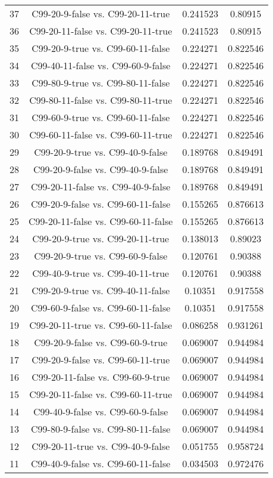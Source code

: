 \documentclass[a4paper,10pt]{article}
\begin{document}
\begin{landscape}
\begin{table}[!htp]
\begin{tabular}{cccc}
37&C99-20-9-false vs. C99-20-11-true&0.241523&0.80915\\
36&C99-20-11-false vs. C99-20-11-true&0.241523&0.80915\\
35&C99-20-9-true vs. C99-60-11-false&0.224271&0.822546\\
34&C99-40-11-false vs. C99-60-9-false&0.224271&0.822546\\
33&C99-80-9-true vs. C99-80-11-false&0.224271&0.822546\\
32&C99-80-11-false vs. C99-80-11-true&0.224271&0.822546\\
31&C99-60-9-true vs. C99-60-11-false&0.224271&0.822546\\
30&C99-60-11-false vs. C99-60-11-true&0.224271&0.822546\\
29&C99-20-9-true vs. C99-40-9-false&0.189768&0.849491\\
28&C99-20-9-false vs. C99-40-9-false&0.189768&0.849491\\
27&C99-20-11-false vs. C99-40-9-false&0.189768&0.849491\\
26&C99-20-9-false vs. C99-60-11-false&0.155265&0.876613\\
25&C99-20-11-false vs. C99-60-11-false&0.155265&0.876613\\
24&C99-20-9-true vs. C99-20-11-true&0.138013&0.89023\\
23&C99-20-9-true vs. C99-60-9-false&0.120761&0.90388\\
22&C99-40-9-true vs. C99-40-11-true&0.120761&0.90388\\
21&C99-20-9-true vs. C99-40-11-false&0.10351&0.917558\\
20&C99-60-9-false vs. C99-60-11-false&0.10351&0.917558\\
19&C99-20-11-true vs. C99-60-11-false&0.086258&0.931261\\
18&C99-20-9-false vs. C99-60-9-true&0.069007&0.944984\\
17&C99-20-9-false vs. C99-60-11-true&0.069007&0.944984\\
16&C99-20-11-false vs. C99-60-9-true&0.069007&0.944984\\
15&C99-20-11-false vs. C99-60-11-true&0.069007&0.944984\\
14&C99-40-9-false vs. C99-60-9-false&0.069007&0.944984\\
13&C99-80-9-false vs. C99-80-11-false&0.069007&0.944984\\
12&C99-20-11-true vs. C99-40-9-false&0.051755&0.958724\\
11&C99-40-9-false vs. C99-60-11-false&0.034503&0.972476\\

\end{tabular}
\end{table}
\end{landscape}
\end{document}
